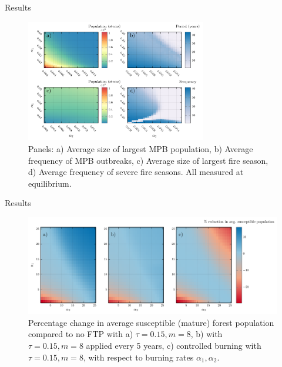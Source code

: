 \documentclass{beamer}
\begin{document}
\begin{frame}{Results}
    \begin{figure}
        \includegraphics[width=0.7\textwidth]{mpb/a1_a2_phase.pdf}
        
        \caption{\footnotesize Panels: a) Average size of largest MPB population, b) Average frequency of MPB outbreaks, c) Average size of largest fire season, d) Average frequency of severe fire seasons. All measured at equilibrium. }
    \end{figure}
\end{frame}
\begin{frame}{Results}
    \begin{figure}
        \includegraphics[width=\textwidth]{mpb/a1_a2_trim_susceptible_loss.pdf}
        \caption{Percentage change in average susceptible (mature) forest population compared to no FTP with a) $\tau = 0.15, m = 8$, b) with $\tau = 0.15, m = 8$ applied every 5 years, c) controlled burning with $\tau = 0.15, m = 8$,  with respect to burning rates $\alpha_1,\alpha_2$.}
    \end{figure}
\end{frame}
\end{document}
